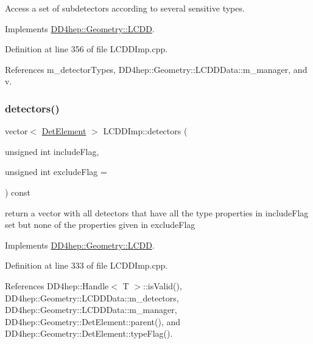 Access a set of subdetectors according to several sensitive types. 



Implements \hyperlink{class_d_d4hep_1_1_geometry_1_1_l_c_d_d_aee911f853a0e585f0ac9be7852ed6954}{D\+D4hep\+::\+Geometry\+::\+L\+C\+DD}.



Definition at line 356 of file L\+C\+D\+D\+Imp.\+cpp.



References m\+\_\+detector\+Types, D\+D4hep\+::\+Geometry\+::\+L\+C\+D\+D\+Data\+::m\+\_\+manager, and v.

\hypertarget{class_d_d4hep_1_1_geometry_1_1_l_c_d_d_imp_a2336b9403823002fb322001b4b723e9e}{}\label{class_d_d4hep_1_1_geometry_1_1_l_c_d_d_imp_a2336b9403823002fb322001b4b723e9e} 
\subsubsection{\texorpdfstring{detectors()}{detectors()}\hspace{0.1cm}{\footnotesize\ttfamily [4/4]}}
{\footnotesize\ttfamily vector$<$ \hyperlink{class_d_d4hep_1_1_geometry_1_1_det_element}{Det\+Element} $>$ L\+C\+D\+D\+Imp\+::detectors (\begin{DoxyParamCaption}\item[{unsigned int}]{include\+Flag,  }\item[{unsigned int}]{exclude\+Flag = {} }\end{DoxyParamCaption}) const\hspace{0.3cm}{\ttfamily [virtual]}}

return a vector with all detectors that have all the type properties in include\+Flag set but none of the properties given in exclude\+Flag 

Implements \hyperlink{class_d_d4hep_1_1_geometry_1_1_l_c_d_d_a1cdc7a631ac397f64b40e7232ee04639}{D\+D4hep\+::\+Geometry\+::\+L\+C\+DD}.



Definition at line 333 of file L\+C\+D\+D\+Imp.\+cpp.



References D\+D4hep\+::\+Handle$<$ T $>$\+::is\+Valid(), D\+D4hep\+::\+Geometry\+::\+L\+C\+D\+D\+Data\+::m\+\_\+detectors, D\+D4hep\+::\+Geometry\+::\+L\+C\+D\+D\+Data\+::m\+\_\+manager, D\+D4hep\+::\+Geometry\+::\+Det\+Element\+::parent(), and D\+D4hep\+::\+Geometry\+::\+Det\+Element\+::type\+Flag().

